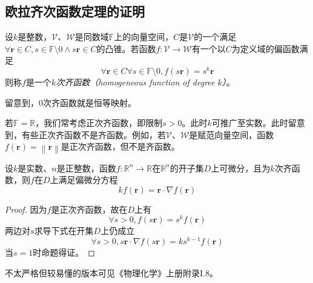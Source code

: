 \documentclass[main.tex]{subfiles}
\begin{document}
\subsection{欧拉齐次函数定理的证明}
\begin{definition}
    设$k$是整数，$\mathcal{V}$、$\mathcal{W}$是同数域$\mathbb{F}$上的向量空间，$C$是$\mathcal{V}$的一个满足$\forall\mathbf{r}\in C,s\in\mathbb{F}\setminus 0\wedge s\mathbf{r}\in C$的凸锥。若函数$f:\mathcal{V}\rightarrow\mathcal{W}$有一个以$C$为定义域的偏函数满足
    \[
    \forall \mathbf{r}\in C\forall s\in\mathbb{F}\setminus 0,f\left(s\mathbf{r}\right)=s^k\mathbf{r}
    \]
    则称$f$是一个\emph{$k$次齐函数（homogeneous function of degree $k$）}。
\end{definition}

留意到，0次齐函数就是恒等映射。

若$\mathbb{F}=\mathbb{R}$，我们常考虑正次齐函数，即限制$s>0$。此时$k$可推广至实数。此时留意到，有些正次齐函数不是齐函数。例如，若$\mathcal{V}$、$\mathcal{W}$是赋范向量空间，函数$f\left(\mathbf{r}\right)=\left\|\mathbf{r}\right\|$是正次齐函数，但不是齐函数。

\begin{theorem}[齐函数的欧拉定理]\label{thm:Euler_theorem_for_homogeneous_function}
设$k$是实数、$n$是正整数，函数$f:\mathbb{R}^n\rightarrow\mathbb{R}$在$\mathbb{R}^n$的开子集$D$上可微分，且为$k$次齐函数，则$f$在$D$上满足偏微分方程
\[kf\left(\mathbf{r}\right)=\mathbf{r}\cdot\nabla f\left(\mathbf{r}\right)\]
\end{theorem}
\begin{proof}
    因为$f$是正次齐函数，故在$D$上有
    \[\forall s>0,f\left(s\mathbf{r}\right)=s^kf\left(\mathbf{r}\right)\]
    两边对$s$求导下式在开集$D$上仍成立
    \[\forall s>0,s\mathbf{r}\cdot\nabla f\left(s\mathbf{r}\right)=ks^{k-1}f\left(\mathbf{r}\right)\]
    当$s=1$时命题得证。
\end{proof}

不太严格但较易懂的版本可见《物理化学》上册附录I.8。
\end{document}
